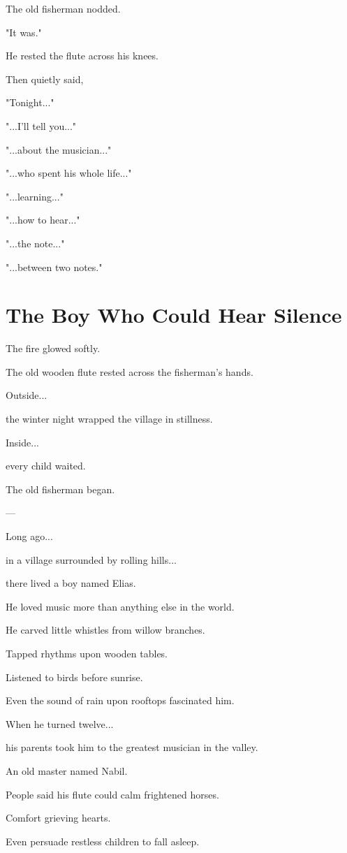 \documentclass[12pt,openany]{book}
\begin{document}
The old fisherman nodded.

"It was."

He rested the flute across his knees.

Then quietly said,

"Tonight..."

"...I'll tell you..."

"...about the musician..."

"...who spent his whole life..."

"...learning..."

"...how to hear..."

"...the note..."

"...between two notes."
\section*{The Boy Who Could Hear Silence}

The fire glowed softly.

The old wooden flute rested across the fisherman's hands.

Outside...

the winter night wrapped the village in stillness.

Inside...

every child waited.

The old fisherman began.

---

Long ago...

in a village surrounded by rolling hills...

there lived a boy named Elias.

He loved music more than anything else in the world.

He carved little whistles from willow branches.

Tapped rhythms upon wooden tables.

Listened to birds before sunrise.

Even the sound of rain upon rooftops fascinated him.

When he turned twelve...

his parents took him to the greatest musician in the valley.

An old master named Nabil.

People said his flute could calm frightened horses.

Comfort grieving hearts.

Even persuade restless children to fall asleep.
\end{document}
